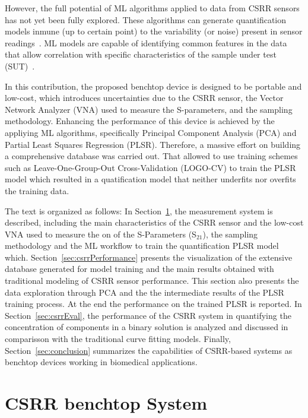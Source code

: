 \documentclass[journal,twoside,web]{ieeecolor}
\begin{document}
However, the full potential of ML algorithms applied to data from CSRR sensors has not yet been fully explored. These algorithms can generate quantification models inmune (up to certain point) to the variability (or noise) present in sensor readings~\cite{Mitchell1997, Wold1987, Wold2001, Nirmal2021}. ML models are capable of identifying common features in the data that allow correlation with specific characteristics of the sample under test (SUT)~\cite{Loutchanwot2022}. 

In this contribution, the proposed benchtop device is designed to be portable and low-cost, which introduces uncertainties due to the CSRR sensor, the Vector Network Analyzer (VNA) used to measure the S-parameters, and the sampling methodology. Enhancing the performance of this device is achieved by the appliying ML algorithms, specifically Principal Component Analysis (PCA) and Partial Least Squares Regression (PLSR). Therefore, a massive effort on building a comprehensive database was carried out. That allowed to use training schemes such as Leave-One-Group-Out Cross-Validation (LOGO-CV) to train the PLSR model which resulted in a quatification model that neither underfits nor overfits the training data. 

The text is organized as follows: In Section~\ref{sec:csrrbenchTop}, the measurement system is described, including the main characteristics of the CSRR sensor and the low-cost VNA used to measure the on of the S-Parameters (S$_{21}$), the sampling methodology and the ML workflow to train the quantification PLSR model which. Section~\ref{sec:csrrPerformance} presents the visualization of the extensive database generated for model training and the main results obtained with traditional modeling of CSRR sensor performance. This section also presents the data exploration through PCA and the the intermediate results of the PLSR training process. At the end the performance on the trained PLSR is reported. In Section~\ref{sec:csrrEval}, the performance of the CSRR system in quantifying the concentration of components in a binary solution is analyzed and discussed in comparisson with the traditional curve fitting models. Finally, Section~\ref{sec:conclusion} summarizes the capabilities of CSRR-based systems as benchtop devices working in biomedical applications.        

\section{CSRR benchtop System}\label{sec:csrrbenchTop}
\end{document}
